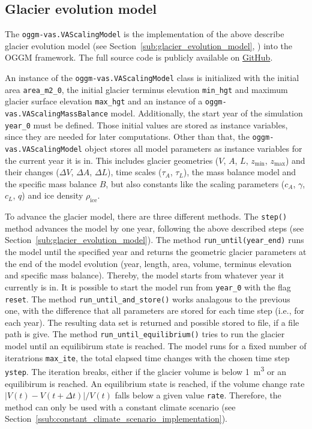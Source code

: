     \subsection{Glacier evolution model} %
    \label{sub:glacier_evolution_model_implementation}

        The \lstinline`oggm-vas.VAScalingModel` is the implementation of the above describe glacier evolution model (see Section~\ref{sub:glacier_evolution_model}, \citet[cf.]{Marzeion2012b}) into the OGGM framework. The full source code is publicly available on \href{https://github.com/OGGM/oggm-vas}{GitHub}.

        An instance of the \lstinline`oggm-vas.VAScalingModel` class is initialized with the initial area \lstinline`area_m2_0`, the initial glacier terminus elevation \lstinline`min_hgt` and maximum glacier surface elevation \lstinline`max_hgt` and an instance of a \lstinline`oggm-vas.VAScalingMassBalance` model. Additionally, the start year of the simulation \lstinline`year_0` must be defined. Those initial values are stored as instance variables, since they are needed for later computations. Other than that, the \lstinline`oggm-vas.VAScalingModel` object stores all model parameters as instance variables for the current year it is in. This includes glacier geometries ($V$, $A$, $L$, $z_\text{min}$, $z_\text{max}$) and their changes ($\Delta V$, $\Delta A$, $\Delta L$), time scales ($\tau_A$, $\tau_L$), the mass balance model and the specific mass balance $B$, but also constants like the scaling parameters ($c_A$, $\gamma$, $c_L$, $q$) and ice density $\rho_\text{ice}$.

        To advance the glacier model, there are three different methods. The \lstinline`step()` method advances the model by one year, following the above described steps (see Section~\ref{sub:glacier_evolution_model}). The method \lstinline`run_until(year_end)` runs the model until the specified year and returns the geometric glacier parameters at the end of the model evolution (year, length, area, volume, terminus elevation and specific mass balance). Thereby, the model starts from whatever year it currently is in. It is possible to start the model run from \lstinline`year_0` with the flag \lstinline`reset`. The method \lstinline`run_until_and_store()` works analagous to the previous one, with the difference that all parameters are stored for each time step (i.e., for each year). The resulting data set is returned and possible stored to file, if a file path is give. The method \lstinline`run_until_equilibrium()` tries to run the glacier model until an equilibirum state is reached. The model runs for a fixed number of iteratrions \lstinline`max_ite`, the total elapsed time changes with the chosen time step \lstinline`ystep`. The iteration breaks, either if the glacier volume is below \SI{1}{\cubic\meter} or an equilibirum is reached. An equilibrium state is reached, if the volume change rate $|V(t) - V(t+\Delta t)|/V(t)$ falls below a given value \lstinline`rate`. Therefore, the method can only be used with a constant climate scenario (see Section~\ref{ssub:constant_climate_scenario_implementation}).
    
